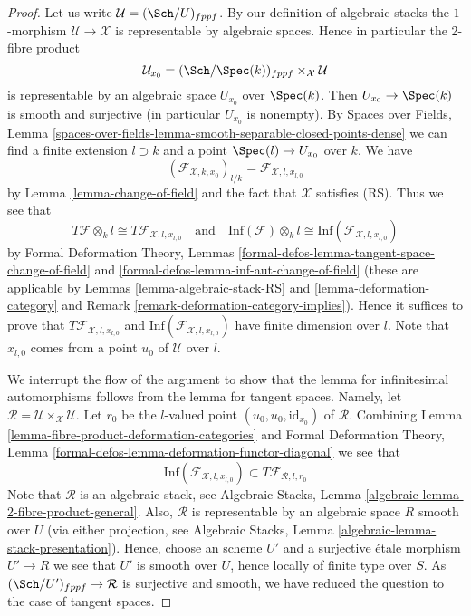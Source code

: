 \begin{proof}
Let us write $\mathcal{U} = (\Sch/U)_{fppf}$. By our definition
of algebraic stacks the $1$-morphism $\mathcal{U} \to \mathcal{X}$
is representable by algebraic spaces. Hence in particular the
2-fibre product
$$
\mathcal{U}_{x_0} = (\Sch/\Spec(k))_{fppf} \times_\mathcal{X} \mathcal{U}
$$
is representable by an algebraic space $U_{x_0}$ over $\Spec(k)$. Then
$U_{x_0} \to \Spec(k)$ is smooth and surjective (in particular $U_{x_0}$
is nonempty). By Spaces over Fields, Lemma
\ref{spaces-over-fields-lemma-smooth-separable-closed-points-dense}
we can find a finite extension $l \supset k$ and a point
$\Spec(l) \to U_{x_0}$ over $k$. We have
$$
(\mathcal{F}_{\mathcal{X}, k , x_0})_{l/k} =
\mathcal{F}_{\mathcal{X}, l, x_{l, 0}}
$$
by Lemma \ref{lemma-change-of-field} and the fact that $\mathcal{X}$
satisfies (RS). Thus we see that
$$
T\mathcal{F} \otimes_k l \cong T\mathcal{F}_{\mathcal{X}, l, x_{l, 0}}
\quad\text{and}\quad
\text{Inf}(\mathcal{F}) \otimes_k l \cong
\text{Inf}(\mathcal{F}_{\mathcal{X}, l, x_{l, 0}})
$$
by
Formal Deformation Theory, Lemmas
\ref{formal-defos-lemma-tangent-space-change-of-field} and
\ref{formal-defos-lemma-inf-aut-change-of-field}
(these are applicable by
Lemmas \ref{lemma-algebraic-stack-RS} and
\ref{lemma-deformation-category} and
Remark \ref{remark-deformation-category-implies}).
Hence it suffices to prove that $T\mathcal{F}_{\mathcal{X}, l, x_{l, 0}}$
and $\text{Inf}(\mathcal{F}_{\mathcal{X}, l, x_{l, 0}})$
have finite dimension over $l$. Note that $x_{l, 0}$ comes from a point
$u_0$ of $\mathcal{U}$ over $l$.

\medskip\noindent
We interrupt the flow of the argument to show that the lemma for
infinitesimal automorphisms follows from the lemma for tangent spaces.
Namely, let
$\mathcal{R} = \mathcal{U} \times_\mathcal{X} \mathcal{U}$.
Let $r_0$ be the $l$-valued point $(u_0, u_0, \text{id}_{x_0})$ of
$\mathcal{R}$. Combining
Lemma \ref{lemma-fibre-product-deformation-categories} and
Formal Deformation Theory, Lemma
\ref{formal-defos-lemma-deformation-functor-diagonal}
we see that
$$
\text{Inf}(\mathcal{F}_{\mathcal{X}, l, x_{l, 0}})
\subset
T\mathcal{F}_{\mathcal{R}, l, r_0}
$$
Note that $\mathcal{R}$ is an algebraic stack, see
Algebraic Stacks, Lemma \ref{algebraic-lemma-2-fibre-product-general}.
Also, $\mathcal{R}$ is representable by an algebraic space $R$
smooth over $U$ (via either projection, see
Algebraic Stacks, Lemma \ref{algebraic-lemma-stack-presentation}).
Hence, choose an scheme $U'$ and a surjective \'etale morphism
$U' \to R$ we see that $U'$ is smooth over $U$, hence locally of
finite type over $S$. As $(\Sch/U')_{fppf} \to \mathcal{R}$ is
surjective and smooth, we have reduced the question to the case
of tangent spaces.


\end{proof}
